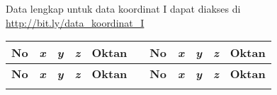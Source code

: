 \vspace*{-0.7\baselineskip}
Data lengkap untuk data koordinat I dapat diakses di \url{http://bit.ly/data_koordinat_I}

\newpage
{} \label{lam: data koord II}
\begin{longtable}[c]{rrrrlcrrrrl}

\cline{1-5}\cline{7-11}
\multicolumn{1}{c}{\textbf{No}} & \multicolumn{1}{c}{\textit{\textbf{x}}} & \multicolumn{1}{c}{\textit{\textbf{y}}} & \multicolumn{1}{c}{\textit{\textbf{z}}} & \multicolumn{1}{c}{\textbf{Oktan}} &       & \multicolumn{1}{c}{\textbf{No}} & \multicolumn{1}{c}{\textit{\textbf{x}}} & \multicolumn{1}{c}{\textit{\textbf{y}}} & \multicolumn{1}{c}{\textit{\textbf{z}}} & \multicolumn{1}{c}{\textbf{Oktan}}\\
\cline{1-5}\cline{7-11}
\endfirsthead

\cline{1-5}\cline{7-11}
\multicolumn{1}{c}{\textbf{No}} & \multicolumn{1}{c}{\textit{\textbf{x}}} & \multicolumn{1}{c}{\textit{\textbf{y}}} & \multicolumn{1}{c}{\textit{\textbf{z}}} & \multicolumn{1}{c}{\textbf{Oktan}} &       & \multicolumn{1}{c}{\textbf{No}} & \multicolumn{1}{c}{\textit{\textbf{x}}} & \multicolumn{1}{c}{\textit{\textbf{y}}} & \multicolumn{1}{c}{\textit{\textbf{z}}} & \multicolumn{1}{c}{\textbf{Oktan}}\\
\cline{1-5}\cline{7-11}
\endhead

\cline{1-5}\cline{7-11}
\endfoot

\cline{1-5}\cline{7-11}
\endlastfoot


\end{longtable}
